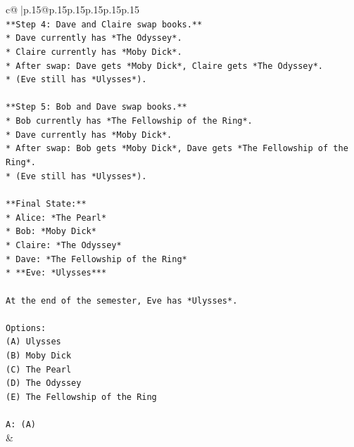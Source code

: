 \documentclass{article}
\begin{document}
{\begin{supertabular}{c@{$\;$}|p{.15\linewidth}@{}p{.15\linewidth}p{.15\linewidth}p{.15\linewidth}p{.15\linewidth}p{.15\linewidth}}
{{{\\ 
\texttt{**Step 4: Dave and Claire swap books.**} \\
\texttt{*   Dave currently has *The Odyssey*.} \\
\texttt{*   Claire currently has *Moby Dick*.} \\
\texttt{*   After swap: Dave gets *Moby Dick*, Claire gets *The Odyssey*.} \\
\texttt{*   (Eve still has *Ulysses*).} \\
\\ 
\texttt{**Step 5: Bob and Dave swap books.**} \\
\texttt{*   Bob currently has *The Fellowship of the Ring*.} \\
\texttt{*   Dave currently has *Moby Dick*.} \\
\texttt{*   After swap: Bob gets *Moby Dick*, Dave gets *The Fellowship of the Ring*.} \\
\texttt{*   (Eve still has *Ulysses*).} \\
\\ 
\texttt{**Final State:**} \\
\texttt{*   Alice: *The Pearl*} \\
\texttt{*   Bob: *Moby Dick*} \\
\texttt{*   Claire: *The Odyssey*} \\
\texttt{*   Dave: *The Fellowship of the Ring*} \\
\texttt{*   **Eve: *Ulysses***} \\
\\ 
\texttt{At the end of the semester, Eve has *Ulysses*.} \\
\\ 
\texttt{Options:} \\
\texttt{(A) Ulysses} \\
\texttt{(B) Moby Dick} \\
\texttt{(C) The Pearl} \\
\texttt{(D) The Odyssey} \\
\texttt{(E) The Fellowship of the Ring} \\
\\ 
\texttt{A: (A)} \\
            }
        }
    }
    & \\ \\


\end{supertabular}}
\end{document}
